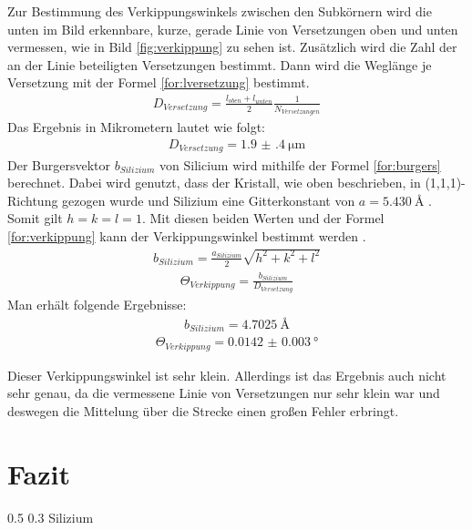 \documentclass[german, %
parskip=full, %
bibliography=totoc, %
]{scrartcl}
\makeatletter
\renewcommand\subsection{\@startsection 
   {subsection}{2}{0mm}%
   {0.5\baselineskip}%
   {0.3\baselineskip}%
   {\bfseries\sffamily\large}%
   }
\makeatother
\begin{document}
Zur Bestimmung des Verkippungswinkels zwischen den Subkörnern wird die unten im Bild erkennbare, kurze, gerade Linie von Versetzungen oben und unten vermessen, wie in Bild \ref{fig:verkippung} zu sehen ist. Zusätzlich wird die Zahl der an der Linie beteiligten Versetzungen bestimmt. Dann wird die Weglänge je Versetzung mit der Formel \ref{for:lversetzung} bestimmt.
\begin{align}
D_{Versetzung} = \frac{l_{oben} + l_{unten}}{2} \frac{1}{N_{Versetzungen}} \label{for:lversetzung}
\end{align}
Das Ergebnis in Mikrometern lautet wie folgt:
\begin{align*}
D_{Versetzung} = \SI[separate-uncertainty = true]{1.9(4)}{\micro\meter}
\end{align*}
Der Burgersvektor $b_{Silizium}$ von Silicium wird mithilfe der Formel \ref{for:burgers} berechnet. Dabei wird genutzt, dass der Kristall, wie oben beschrieben, in (1,1,1)-Richtung gezogen wurde und Silizium eine Gitterkonstant von $a = \SI{5.430}{\angstrom}$ \cite[S.24]{kittel}. Somit gilt $h = k = l = 1$. Mit diesen beiden Werten und der Formel \ref{for:verkippung} kann der Verkippungswinkel bestimmt werden \cite[S.661]{kittel}.
\begin{align}
b_{Silizium} = \frac{a_{Silizium}}{2}\sqrt{h^2+k^2+l^2} \label{for:burgers}
\end{align}
\begin{align}
\Theta_{Verkippung} = \frac{b_{Silizium}}{D_{Versetzung}} \label{for:verkippung}
\end{align}
Man erhält folgende Ergebnisse:
\begin{align*}
b_{Silizium} = \SI{4.7025}{\angstrom}
\end{align*}
\begin{align*}
\Theta_{Verkippung} = \SI[separate-uncertainty = true]{0.0142(30)}{\degree}
\end{align*}

Dieser Verkippungswinkel ist sehr klein. Allerdings ist das Ergebnis auch nicht sehr genau, da die vermessene Linie von Versetzungen nur sehr klein war und deswegen die Mittelung über die Strecke einen großen Fehler erbringt. 

\section{Fazit}

\subsection{Silizium}
\end{document}
